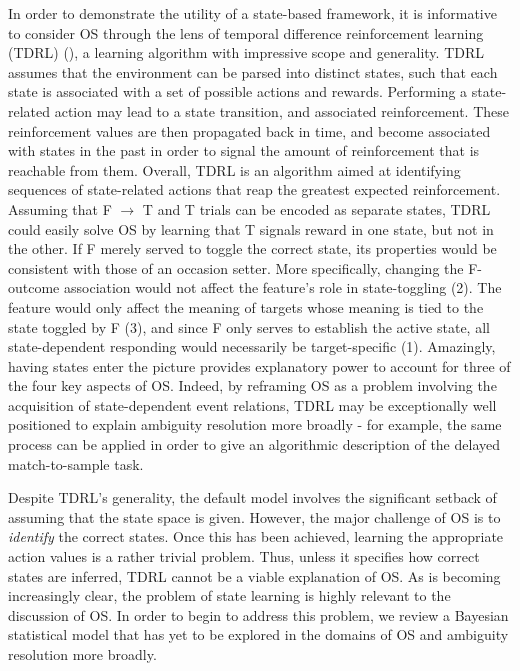 \documentclass[11pt]{article}
\let\citeNP=\citealt
\begin{document}
In order to demonstrate the utility of a state-based framework, it is 
informative to consider OS through the lens of temporal difference 
reinforcement learning (TDRL) (\citeNP{Sutton1998,Maia2009,Niv2009}), a 
learning algorithm with impressive scope and generality. TDRL assumes that the 
environment can be parsed into distinct states, such that each state is 
associated with a set of possible actions and rewards. Performing a state-
related action may lead to a state transition, and associated reinforcement. 
These reinforcement values are then propagated back in time, and become 
associated with states in the past in order to signal the amount of 
reinforcement that is reachable from them. Overall, TDRL is an algorithm aimed 
at identifying sequences of state-related actions that reap the greatest 
expected reinforcement. Assuming that F $\rightarrow$ T and T trials can be 
encoded as separate states, TDRL could easily solve OS by learning that T 
signals reward in one state, but not in the other. If F merely served to toggle 
the correct state, its properties would be consistent with those of an occasion 
setter. More specifically, changing the F-outcome association would not affect 
the feature's role in state-toggling (2). The feature would only affect the 
meaning of targets whose meaning is tied to the state toggled by F (3), and 
since F only serves to establish the active state, all state-dependent 
responding would necessarily be target-specific (1). Amazingly, having states 
enter the picture provides explanatory power to account for three of the four 
key aspects of OS. Indeed, by reframing OS as a problem involving the 
acquisition of state-dependent event relations, TDRL may be exceptionally well 
positioned to explain ambiguity resolution more broadly - for example, the same 
process can be applied in order to give an algorithmic description of the 
delayed match-to-sample task. 

Despite TDRL's generality, the default model involves the significant setback 
of assuming that the state space is given. However, the major challenge of OS 
is to \textit{identify} the correct states. Once this has been achieved, 
learning the appropriate action values is a rather trivial problem. Thus, 
unless it specifies how correct states are inferred, TDRL cannot be a viable 
explanation of OS. As is becoming increasingly clear, the problem of state 
learning is highly relevant to the discussion of OS. In order to begin to 
address this problem, we review a Bayesian statistical model that has yet to be 
explored in the domains of OS and ambiguity resolution more broadly.
\end{document}
